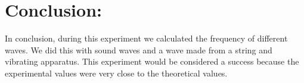 \documentclass{article}
\begin{document}
\singlespace
\newpage

\section*{Conclusion:}
In conclusion, during this experiment we calculated the frequency of different waves.  We did this with sound waves and a wave made from a string and vibrating apparatus.  This experiment would be considered a success because the experimental values were very close to the theoretical values. 
\end{document}
